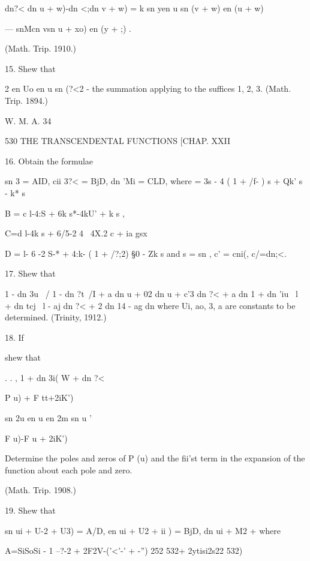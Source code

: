 dn?< dn  u + w)-dn <;dn  v + w) = k   sn yen u sn (v + w) en (u + w) 

— snMcn vsn u + xo) en (y +  ;) . 

(Math. Trip. 1910.) 

15. Shew that 

2 en Uo en u  sn (?<2 - %
the summation applying to the suffices 1, 2, 3. (Math. Trip. 1894.) 

W. M. A. 34 



530 THE TRANSCENDENTAL FUNCTIONS [CHAP. XXII 

16. Obtain the formulae 

sn 3  = AID, cii 3?< = BjD, dn 'Mi = CLD, 
where   = 3s - 4 ( 1 + /f- ) s +  Qk'  s  - k* s%

B = c l-4:S  + 6k s*-4kU'  + k s  , 

C=d l-4k s  + 6/5-2  4 \  4X.2  c + ia gsx  

D = l- 6 -2 S-* + 4:k- ( 1 + /?;2) §0 - Zk  s%
and s = sn  , c' = cni(, c/=dn;<. 

17. Shew that 

1 - dn 3u \  / 1 - dn ?t\ /I + a  dn u + 02 dn  u + c'3 dn  ?< + a  dn 
1 + dn 'iu \ l + dn tcj \ l - aj dn ?< +  2 dn  14 - ag dn  %
where Ui, ao,  3, a  are constants to be determined. (Trinity, 1912.) 



18. If 



shew that 



  . . , 1 + dn 3i(  
  W + dn ?< 



P u) + F tt+2iK') 



sn 2u en u 
en 2m sn u ' 



F u)-F u + 2iK') 

Determine the poles and zeros of P (u) and the fii'st term in the expansion of the 
function about each pole and zero. 

(Math. Trip. 1908.) 

19. Shew that 

sn  ui + U-2 + U3) = A/D, en  ui + U2 + ii ) = BjD, dn  ui + M2 + %
where 

A=SiSoSi  - 1 --?-2 + 2F2V-('<'-'  +  -'') 252 532+ 2ytisi2s22 532) 


